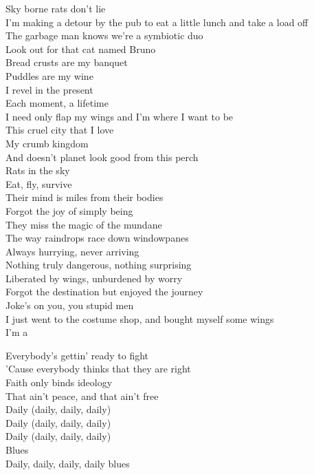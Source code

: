 Sky borne rats don't lie\\
I'm making a detour by the pub to eat a little lunch and take a load off\\
The garbage man knows we're a symbiotic duo\\
Look out for that cat named Bruno\\

Bread crusts are my banquet\\
Puddles are my wine\\
I revel in the present\\
Each moment, a lifetime\\
I need only flap my wings and I'm where I want to be\\
This cruel city that I love\\
My crumb kingdom\\
And doesn't planet  look good from this perch\\
Rats in the sky\\
Eat, fly, survive\\

Their mind is miles from their bodies\\
Forgot the joy of simply being\\
They miss the magic of the mundane\\
The way raindrops race down windowpanes\\
Always hurrying, never arriving\\
Nothing truly dangerous, nothing surprising\\
Liberated by wings, unburdened by worry\\
Forgot the destination but enjoyed the journey\\

Joke's on you, you stupid men\\
I just went to the costume shop, and bought myself some wings\\
I'm a \\



Everybody's gettin' ready to fight\\
'Cause everybody thinks that they are right\\
Faith only binds ideology\\
That ain't peace, and that ain't free\\
Daily (daily, daily, daily)\\
Daily (daily, daily, daily)\\
Daily (daily, daily, daily)\\
Blues\\
Daily, daily, daily, daily blues\\

